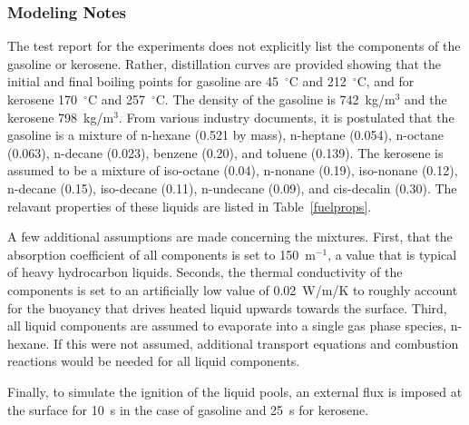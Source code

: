 \subsubsection{Modeling Notes}

The test report for the experiments does not explicitly list the components of the gasoline or kerosene. Rather, distillation curves are provided showing that the initial and final boiling points for gasoline are 45~$^\circ$C and 212~$^\circ$C, and for kerosene 170~$^\circ$C and 257~$^\circ$C. The density of the gasoline is 742~kg/m$^3$ and the kerosene 798~kg/m$^3$. From various industry documents, it is postulated that the gasoline is a mixture of n-hexane (0.521 by mass), n-heptane (0.054), n-octane (0.063), n-decane (0.023), benzene (0.20), and toluene (0.139). The kerosene is assumed to be a mixture of iso-octane (0.04), n-nonane (0.19), iso-nonane (0.12), n-decane (0.15), iso-decane (0.11), n-undecane (0.09), and cis-decalin (0.30). The relavant properties of these liquids are listed in Table~\ref{fuelprops}.

A few additional assumptions are made concerning the mixtures. First, that the absorption coefficient of all components is set to 150~m$^{-1}$, a value that is typical of heavy hydrocarbon liquids. Seconds, the thermal conductivity of the components is set to an artificially low value of 0.02~W/m/K to roughly account for the buoyancy that drives heated liquid upwards towards the surface. Third, all liquid components are assumed to evaporate into a single gas phase species, n-hexane. If this were not assumed, additional transport equations and combustion reactions would be needed for all liquid components.

Finally, to simulate the ignition of the liquid pools, an external flux is imposed at the surface for 10~s in the case of gasoline and 25~s for kerosene.
 
